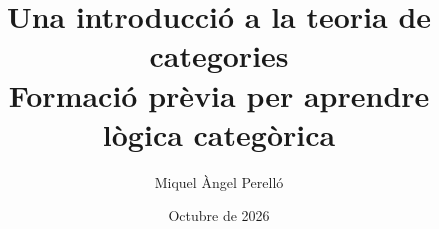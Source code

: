 \newcommand{\llibretitol}{Una introducció a la teoria de categories}
\newcommand{\llibresubtitol}{Formació prèvia per aprendre lògica categòrica}
\newcommand{\llibreautor}{Miquel Àngel Perelló}
\newcommand{\llibreversio}{1.8}
\newcommand{\llibredata}{Octubre de 2026}
\newcommand{\llibreany}{2026}
\newcommand{\llibreweb}{\url{https://aprendes.com/logcat/}}
\newcommand{\llibrerepositori}{\url{https://github.com/maperello/aprendes}}
\newcommand{\llibreerrates}{\url{https://github.com/maperello/aprendes/issues}}

\title{\llibretitol\\[0.8em]\large\llibresubtitol}
\author{\llibreautor}
\date{\llibredata}

\newcommand{\hypermetadata}{%
  \hypersetup{%
    pdftitle={\llibretitol},
    pdfauthor={\llibreautor},
    pdfsubject={Introducció a la teoria de categories orientada cap a la lògica categòrica. Versió \llibreversio\ (\llibredata). Llicència CC BY-SA 4.0},
    pdfkeywords={teoria de categories, lògica categòrica, topos, Yoneda, adjuncions}%
  }%
}
